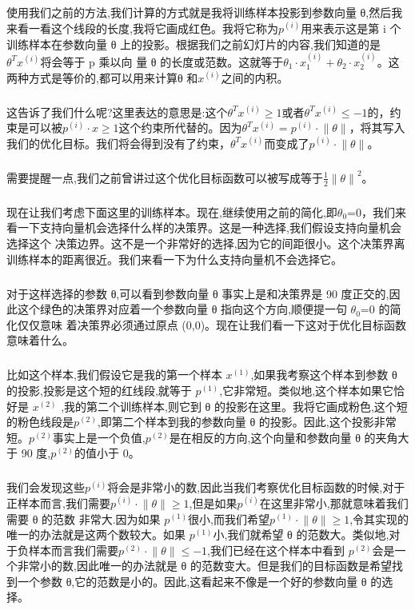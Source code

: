 \documentclass{article}
\begin{document}
\begin{CJK}{UTF8}{gbsn}
\subparagraph{}
使用我们之前的方法,我们计算的方式就是我将训练样本投影到参数向量 θ,然后我来看一看这个线段的长度,我将它画成红色。我将它称为$p^{(i)}$用来表示这是第 i 个训练样本在参数向量 θ 上的投影。根据我们之前幻灯片的内容,我们知道的是$\theta^Tx^{(i)}$将会等于 p 乘以向
量 θ 的长度或范数。这就等于$\theta_1\cdot{x_1^{(i)}}+\theta_2\cdot{x_2^{(i)}}$。这两种方式是等价的,都可以用来计算θ 和$x^{(i)}$之间的内积。
\subparagraph{}
这告诉了我们什么呢?这里表达的意思是:这个$\theta^Tx^{(i)}\geq{1}$或者$\theta^Tx^{(i)}\leq{-1}$的，约束是可以被$p^{(i)}\cdot{x}\geq{1}$这个约束所代替的。因为$\theta^Tx^{(i)}=p^{(i)}\cdot{\parallel{\theta}\parallel}$，将其写入我们的优化目标。我们将会得到没有了约束，$\theta^Tx^{(i)}$而变成了$p^{(i)}\cdot{\parallel{\theta}\parallel}$。
\subparagraph{}
需要提醒一点,我们之前曾讲过这个优化目标函数可以被写成等于$\frac{1}{2}{\parallel{\theta}\parallel}^2$。
\begin{figure}[H]
\label{fig:721}
\end{figure}
\subparagraph{}
现在让我们考虑下面这里的训练样本。现在,继续使用之前的简化,即$\theta_0$=0，我们来看一下支持向量机会选择什么样的决策界。这是一种选择,我们假设支持向量机会选择这个
决策边界。这不是一个非常好的选择,因为它的间距很小。这个决策界离训练样本的距离很近。我们来看一下为什么支持向量机不会选择它。
\subparagraph{}
对于这样选择的参数 θ,可以看到参数向量 θ 事实上是和决策界是 90 度正交的,因此这个绿色的决策界对应着一个参数向量 θ 指向这个方向,顺便提一句 $\theta_0$=0 的简化仅仅意味
着决策界必须通过原点 (0,0)。现在让我们看一下这对于优化目标函数意味着什么。
\subparagraph{}
\begin{figure}[H]
\label{fig:722}
\end{figure}
比如这个样本,我们假设它是我的第一个样本 $x^{(1)}$,如果我考察这个样本到参数 θ 的投影,投影是这个短的红线段,就等于 $p^{(1)}$,它非常短。类似地,这个样本如果它恰好是 $x^{(2)}$ ,我的第二个训练样本,则它到 θ 的投影在这里。我将它画成粉色,这个短的粉色线段是$p^{(2)}$,即第二个样本到我的参数向量 θ 的投影。因此,这个投影非常短。$p^{(2)}$事实上是一个负值,$p^{(2)}$是在相反的方向,这个向量和参数向量 θ 的夹角大于 90 度,$p^{(2)}$的值小于 0。
\subparagraph{}
我们会发现这些$p^{(i)}$将会是非常小的数,因此当我们考察优化目标函数的时候,对于正样本而言,我们需要$p^{(i)}\cdot{\parallel{\theta}\parallel}\geq{1}$,但是如果$p^{(i)}$在这里非常小,那就意味着我们需要 θ 的范数
非常大.因为如果 $p^{(1)}$很小,而我们希望$p^{(1)}\cdot{\parallel{\theta}\parallel}\geq{1}$,令其实现的唯一的办法就是这两个数较大。如果 $p^{(1)}$小,我们就希望 θ 的范数大。类似地,对于负样本而言我们需要$p^{(2)}\cdot{\parallel{\theta}\parallel}\leq{-1}$,我们已经在这个样本中看到 $p^{(2)}$会是一个非常小的数,因此唯一的办法就是 θ 的范数变大。但是我们的目标函数是希望找到一个参数 θ,它的范数是小的。因此,这看起来不像是一个好的参数向量 θ 的选择。

\end{CJK}
\end{document}
